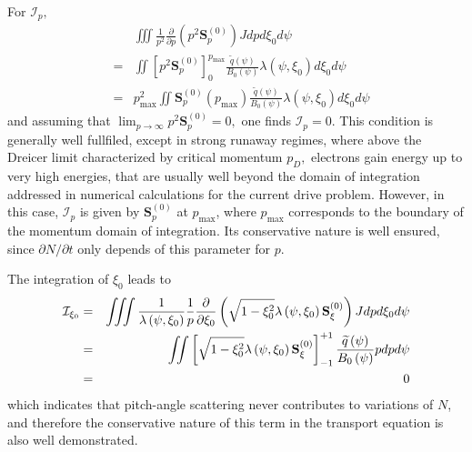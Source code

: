 For $\mathcal{I}_{p},$
\begin{eqnarray}
&&\iiint \frac{1}{p^{2}}\frac{\partial }{\partial p}\left( p^{2}\mathbf{S}%
_{p}^{\left( 0\right) }\right) Jdpd\xi _{0}d\psi   \nonumber \\
&=&\iint \left[ p^{2}\mathbf{S}_{p}^{\left( 0\right) }\right] _{0}^{p_{\max
}}\frac{\widetilde{q}\left( \psi \right) }{B_{0}\left( \psi \right) }\lambda
\left( \psi ,\xi _{0}\right) d\xi _{0}d\psi   \nonumber \\
&=&p_{\max }^{2}\iint \mathbf{S}_{p}^{\left( 0\right) }\left( p_{\max
}\right) \frac{\widetilde{q}\left( \psi \right) }{B_{0}\left( \psi \right) }
\lambda \left( \psi ,\xi _{0}\right) d\xi _{0}d\psi
\end{eqnarray}
and assuming that $\lim_{p\rightarrow \infty }p^{2}\mathbf{S}_{p}^{\left(
0\right) }=0,$ one finds $\mathcal{I}_{p}=0.$ This condition is generally
well fullfiled, except in strong runaway regimes, where above the Dreicer
limit characterized by critical momentum $p_{D},$ electrons gain energy up
to very high energies, that are usually well beyond the domain of
integration addressed in numerical calculations for the current drive
problem. However, in this case, $\mathcal{I}_{p}$ is given by $\mathbf{S}%
_{p}^{\left( 0\right) }$ at $p_{\max }$, where $p_{\max }$ corresponds to
the boundary of the momentum domain of integration. Its conservative nature
is well ensured, since $\partial N/\partial t$ only depends of this
parameter for $p$.

The integration of $\xi _{0}$ leads to
\begin{eqnarray}
\mathcal{I}_{\xi _{0}} &=&\iiint \frac{1}{\lambda \left( \psi ,\xi
_{0}\right) }\frac{1}{p}\frac{\partial }{\partial \xi _{0}}\left( \sqrt{%
1-\xi _{0}^{2}}\lambda \left( \psi ,\xi _{0}\right) \mathbf{S}_{\xi
}^{\left( 0\right) }\right) Jdpd\xi _{0}d\psi   \nonumber \\
&=&\iint \left[ \sqrt{1-\xi _{0}^{2}}\lambda \left( \psi ,\xi _{0}\right)
\mathbf{S}_{\xi }^{\left( 0\right) }\right] _{-1}^{+1}\frac{\widetilde{q}
\left( \psi \right) }{B_{0}\left( \psi \right) }pdpd\psi   \nonumber \\
&=&0
\end{eqnarray}
which indicates that pitch-angle scattering never contributes to variations
of $N$, and therefore the conservative nature of this term in the transport
equation is also well demonstrated.

